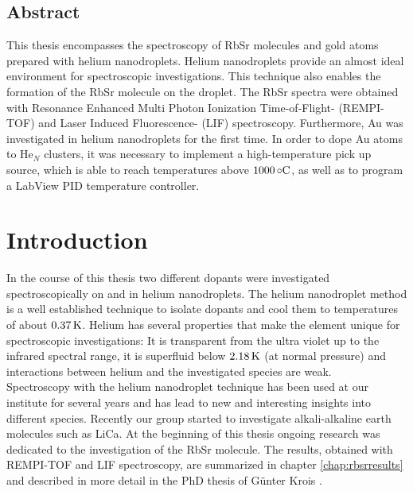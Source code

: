 \documentclass[parskip,12pt,headsepline,a4paper] {scrbook}
\begin{document}
\section*{Abstract}
\vspace{-0.5\baselineskip}
This thesis encompasses the spectroscopy of RbSr molecules and gold atoms prepared with helium nanodroplets. Helium nanodroplets provide an almost ideal environment for spectroscopic investigations. This technique also enables the formation of the RbSr molecule on the droplet. The RbSr spectra were obtained with Resonance Enhanced Multi Photon Ionization Time-of-Flight- (REMPI-TOF) and Laser Induced Fluorescence- (LIF) spectroscopy. Furthermore, Au was investigated in helium nanodroplets for the first time. In order to dope Au atoms to He$_N$ clusters, it was necessary to implement a high-temperature pick up source, which is able to reach temperatures above $\unit[1000]{\circ C}$, as well as to program a LabView PID temperature controller.

\newpage



\tableofcontents

\mainmatter
\chapter{Introduction}
\setcounter{page}{1}
In the course of this thesis two different dopants were investigated spectroscopically on and in helium nanodroplets. The helium nanodroplet method is a well established technique to isolate dopants and cool them to temperatures of about $\unit[0.37]{K}$. Helium has several properties that make the element unique for spectroscopic investigations: It is transparent from the ultra violet up to the infrared spectral range, it is superfluid below $\unit[2.18]{K}$ (at normal pressure) and interactions between helium and the investigated species are weak. \\
Spectroscopy with the helium nanodroplet technique has been used at our institute for several years and has lead to new and interesting insights into different species. %
Recently our group started to investigate alkali-alkaline earth molecules such as LiCa. At the beginning of this thesis ongoing research was dedicated to the investigation of the RbSr molecule. The results, obtained with REMPI-TOF and LIF spectroscopy, are summarized in chapter \ref{chap:rbsrresults} and described in more detail in the PhD thesis of G\"unter Krois \cite{krois-doc}.
\end{document}
